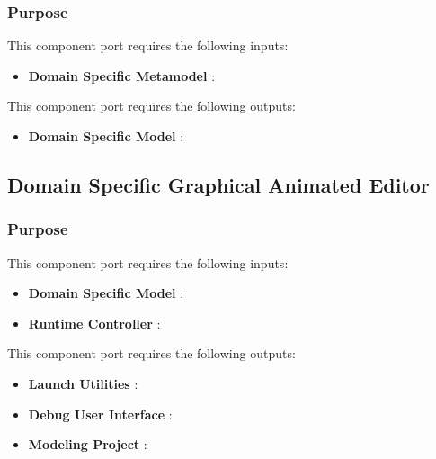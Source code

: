 \documentclass{gemoc} %
\begin{document}
\subsubsection{Purpose}

This component port requires the following inputs:
\begin{itemize}
  \item \textbf{Domain Specific Metamodel} :
\end{itemize}

This component port requires the following outputs:
\begin{itemize}
  \item \textbf{Domain Specific Model} :
\end{itemize}

\subsection{Domain Specific Graphical Animated Editor}


\subsubsection{Purpose}

This component port requires the following inputs:
\begin{itemize}
  \item \textbf{Domain Specific Model} :
  \item \textbf{Runtime Controller} :
\end{itemize}

This component port requires the following outputs:
\begin{itemize}
  \item \textbf{Launch Utilities} :
  \item \textbf{Debug User Interface} :
  \item \textbf{Modeling Project} :
\end{itemize}
\end{document}
